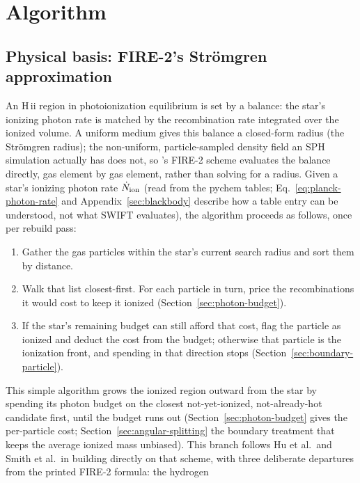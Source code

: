 \section{Algorithm}
\label{sec:algorithm}

\subsection{Physical basis: FIRE-2's Strömgren approximation}
\label{sec:fire2-basis}

An H\,{\sc ii} region in photoionization equilibrium is set by a
balance: the star's ionizing photon rate is matched by the
recombination rate integrated over the ionized volume. A uniform
medium gives this balance a closed-form radius (the Strömgren
radius); the non-uniform, particle-sampled density field an SPH
simulation actually has does not, so \citet[Appendix~E]{Hopkins2018}'s
FIRE-2 scheme evaluates the balance directly, gas element by gas
element, rather than solving for a radius. Given a star's ionizing
photon rate $\dot N_{\rm ion}$ (read from the pychem tables;
Eq.~\ref{eq:planck-photon-rate} and Appendix~\ref{sec:blackbody}
describe how a table entry can be understood, not what SWIFT
evaluates), the algorithm proceeds as follows, once
per rebuild pass:
\begin{enumerate}
  \item Gather the gas particles within the star's current search
    radius and sort them by distance.
  \item Walk that list closest-first. For each particle in turn, price
    the recombinations it would cost to keep it ionized
    (Section~\ref{sec:photon-budget}).
  \item If the star's remaining budget can still afford that cost,
    flag the particle as ionized and deduct the cost from the budget;
    otherwise that particle is the ionization front, and spending in
    that direction stops (Section~\ref{sec:boundary-particle}).
\end{enumerate}
This simple algorithm grows the ionized region outward from the star by
spending its photon budget on the closest not-yet-ionized,
not-already-hot candidate first, until the budget runs out
(Section~\ref{sec:photon-budget} gives the per-particle cost;
Section~\ref{sec:angular-splitting} the boundary treatment that keeps
the average ionized mass unbiased). This branch follows Hu et al.\ and
Smith et al.\ in building directly on that scheme, with three
deliberate departures from the printed FIRE-2 formula: the hydrogen
